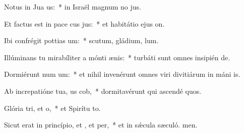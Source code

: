 \item Notus in Jua us:~* in Israël magnum no jus.
\item Et factus est in pace cus jus:~* et habitátio ejus  on.
\item Ibi confrégit pottias um:~* scutum, gládium,  lum.
\item Illúminans tu mirabíliter a mónti ænis:~* turbáti sunt omnes insipién de.
\item Dormiérunt num um:~* et nihil invenérunt omnes viri divitiárum in máni is.
\item Ab increpatióne tua, us cob,~* dormitavérunt qui ascendé quos.
\item Glória tri, et o,~* et Spirítu to.
\item Sicut erat in princípio, et , et per,~* et in sǽcula sæculó. men.
